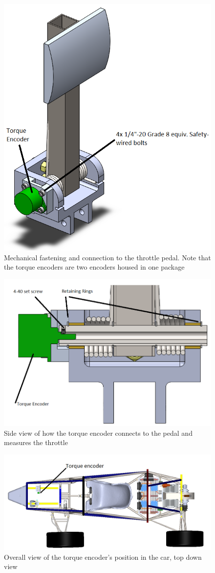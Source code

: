 \documentclass{article}
\begin{document}
        \begin{figure}[H]
            \centering
            \includegraphics[width = 0.5 \textwidth]{torqueencoder}
            \caption{Mechanical fastening and connection to the throttle pedal. Note that the torque encoders are two encoders housed in one package}
            \label{torquefront}
        \end{figure}

        \begin{figure}[H]
            \centering
            \includegraphics[width = 0.7 \textwidth]{torqueside}
            \caption{Side view of how the torque encoder connects to the pedal and measures the throttle}
            \label{torqside}
        \end{figure}

        \begin{figure}[H]
            \centering
            \includegraphics[width = 0.7 \textwidth]{torquefullcar}
            \caption{Overall view of the torque encoder's position in the car, top down view}
            \label{torquetopdown}
        \end{figure}
\end{document}
